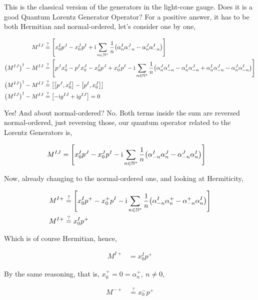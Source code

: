 This is the classical version of the generators in the light-cone gauge. Does it is a good Quantum Lorentz Generator Operator? 
For a positive answer, it has to be both Hermitian and normal-ordered, let's consider one by one,

\begin{align*}
    M^{IJ}&\stackrel{?}{=}\left[x_0^I p^J-x_0^J p^I+\im\sum\limits_{n\in\mathbb N^\ast}\frac{1}{n}\qty(\alpha^I_n\alpha^J_{-n}-\alpha^J_n\alpha^I_{-n})\right]\\
    \qty(M^{IJ})^\dagger-M^{IJ}&\stackrel{?}{=}\left[p^Jx_0^I -p^Ix_0^J -x_0^I p^J+x_0^J p^I-\im\sum\limits_{n\in\mathbb N^\ast}\frac{1}{n}\qty(\alpha^J_{n}\alpha^I_{-n}-\alpha^I_{n}\alpha^J_{-n}+\alpha^I_n\alpha^J_{-n}-\alpha^J_n\alpha^I_{-n})\right]\\
    \qty(M^{IJ})^\dagger-M^{IJ}&\stackrel{?}{=}\left[\comm{p^J}{x_0^I} -\comm{p^I}{x_0^J}\right]\\
    \qty(M^{IJ})^\dagger-M^{IJ}&\stackrel{?}{=}\left[-\im g^{IJ} +\im  g^{IJ}\right]=0
\end{align*}

Yes! And about normal-ordered? No. Both terms inside the sum are reversed normal-ordered, just reversing those, 
our quantum operator related to the Lorentz Generators is,

\begin{align*}
    M^{IJ}&=\left[x_0^I p^J-x_0^J p^I-\textnormal{i}\sum\limits_{n\in\mathbb N^\ast}\frac{1}{n}\qty(\alpha^I_{-n}\alpha^J_n-\alpha^J_{-n}\alpha^I_n)\right]
\end{align*}

Now, already changing to the normal-ordered one, and looking at Hermiticity,

\begin{align*}
    M^{I+}&\stackrel{?}{=}\left[x_0^I p^+-x_0^+ p^I-\textnormal{i}\sum\limits_{n\in\mathbb N^\ast}\frac{1}{n}\qty(\alpha^I_{-n}\alpha^+_{n}-\alpha^+_{-n}\alpha^I_{n})\right]\\
    M^{I+}&\stackrel{?}{=}x_0^I p^+
\end{align*}

Which is of course Hermitian, hence,

\begin{align*}
    M^{I+}&=x_0^I p^+
\end{align*}

By the same reasoning, that is, $x_0^+=0=\alpha_n^+,\ n\neq 0$,

\begin{align*}
    M^{-+}&\stackrel{?}{=}x_0^- p^+
\end{align*}

